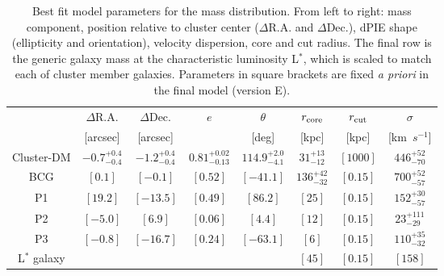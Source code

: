 \documentclass[12pt]{article}
\begin{document}
\begin{table}[ht]
    \centering
    \begin{tabular}{c|c|c|c|c|c|c|c|}
{Potential & $\Delta$R.A. & $\Delta$Dec. & $e$ & $\theta$ & $r_{\rm core}$ & $r_{\rm cut}$ & $\sigma$ \\}
 & [arcsec] & [arcsec] & & [deg] & [kpc] & [kpc] & [km\ $s^{-1}$] \\%
\hline
Cluster-DM & $ -0.7^{+  0.4}_{ -0.4}$ & $ -1.2^{+  0.4}_{ -0.4}$ & $ 0.81^{+ 0.02}_{-0.13}$ & $114.9^{+  2.0}_{ -4.1}$ & $31^{+13}_{-12}$ & $[1000]$ & $446^{+52}_{-70}$ \\
BCG            & $[  0.1]$ & $[ -0.1]$ & $[0.52]$ & $[-41.1]$ & $136^{+42}_{-32}$ & $[0.15]$ & $700^{+52}_{-57}$ \\
P1             & $[ 19.2]$ & $[-13.5]$ & $[0.49]$ & $[ 86.2]$ & $[25]$            & $[0.15]$ & $152^{+30}_{-57}$ \\
P2             & $[ -5.0]$ & $[  6.9]$ & $[0.06]$ & $[  4.4]$ & $[12]$            & $[0.15]$ & $23^{+111}_{-29}$ \\
P3             & $[ -0.8]$ & $[-16.7]$ & $[0.24]$ & $[-63.1]$ & $[6]$             & $[0.15]$ & $110^{+35}_{-32}$ \\
L$^{*}$ galaxy &           &           &          &           & $[45]$            & $[0.15]$ & $[158]$\\            
\hline
    \end{tabular}
    \caption{Best fit model parameters for the mass distribution. From left to right: mass component, position relative to cluster center ($\Delta$R.A. and $\Delta$Dec.), dPIE shape (ellipticity and orientation), velocity dispersion, core and cut radius. The final row 
    is the generic galaxy mass at the characteristic luminosity L$^*$, which is scaled to match each of cluster member galaxies.  Parameters in square brackets are fixed {\it a priori} in the final model (version E). }
    \label{tab:massmodel}
\end{table}
\end{document}
